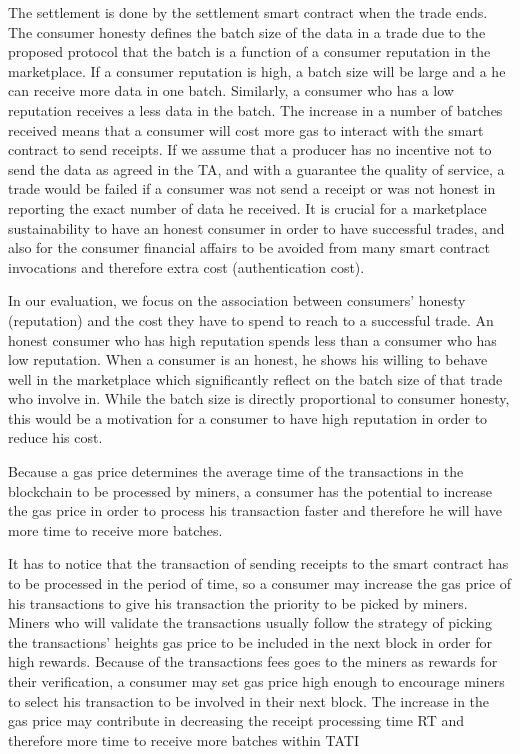 \documentclass[letterpaper, 10 pt, conference]{ieeeconf}  %
\begin{document}
The settlement is done by the settlement smart contract when the trade ends. 
The consumer honesty defines the batch size of the data in a trade due to the proposed protocol that the batch is a function of a consumer reputation in the marketplace. If a consumer reputation is high, a batch size will be large and a he can receive more data in one batch. Similarly, a consumer who has a low reputation receives a less data in the batch. The increase in a number of batches received means that a consumer will cost more gas to interact with the smart contract to send receipts. If we assume that a producer has no incentive not to send the data as agreed in the TA, and with a guarantee the quality of service, a trade would be failed if a consumer was not send a receipt or was not honest in reporting the exact number of data he received. It is crucial for a marketplace sustainability to have an honest consumer in order to have successful trades, and also for the consumer financial affairs to be avoided from many smart contract invocations and therefore extra cost (authentication cost).

In our evaluation, we focus on the association between consumers’ honesty (reputation) and the cost they have to spend to reach to a successful trade. An honest consumer who has high reputation spends less than a consumer who has low reputation. When a consumer is an honest, he shows his willing to behave well in the marketplace which significantly reflect on the batch size of that trade who involve in. While the batch size is directly proportional to consumer honesty, this would be a motivation for a consumer to have high reputation in order to reduce his cost.

Because a gas price determines the average time of the transactions in the blockchain to be processed by miners, a consumer has the potential to increase the gas price in order to process his transaction faster and therefore he will have more time to receive more batches. 

It has to notice that the transaction of sending receipts to the smart contract has to be processed in the period of time, so a consumer may increase the gas price of his transactions to give his transaction the priority to be picked by miners. Miners who will validate the transactions usually follow the strategy of picking the transactions’ heights gas price to be included in the next block in order for high rewards. Because of the transactions fees goes to the miners as rewards for their verification, a consumer may set gas price high enough to encourage miners to select his transaction to be involved in their next block. The increase in the gas price may contribute in decreasing the receipt processing time RT and therefore more time to receive more batches within TATI
\end{document}
